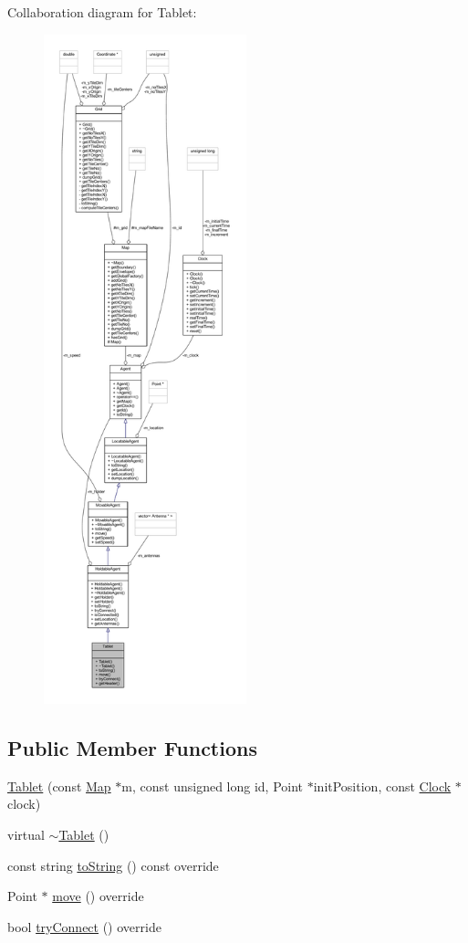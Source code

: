 Collaboration diagram for Tablet\+:
\nopagebreak
\begin{figure}[H]
\begin{center}
\leavevmode
\includegraphics[height=550pt]{class_tablet__coll__graph}
\end{center}
\end{figure}
\subsection*{Public Member Functions}
\begin{DoxyCompactItemize}
\item 
\hyperlink{class_tablet_af457c0988b7a768659a284e16be58dc6}{Tablet} (const \hyperlink{class_map}{Map} $\ast$m, const unsigned long id, Point $\ast$init\+Position, const \hyperlink{class_clock}{Clock} $\ast$clock)
\item 
virtual \hyperlink{class_tablet_ac18d46eafd643e66dde81a3fefadab89}{$\sim$\+Tablet} ()
\item 
const string \hyperlink{class_tablet_a3fae01e7d526699476221c6a686a4fba}{to\+String} () const override
\item 
Point $\ast$ \hyperlink{class_tablet_ab1b8c7591be0c6ea118c8ab1c17839bb}{move} () override
\item 
bool \hyperlink{class_tablet_a2328422e1706dfeb2b51a6960e6879f0}{try\+Connect} () override
\end{DoxyCompactItemize}
